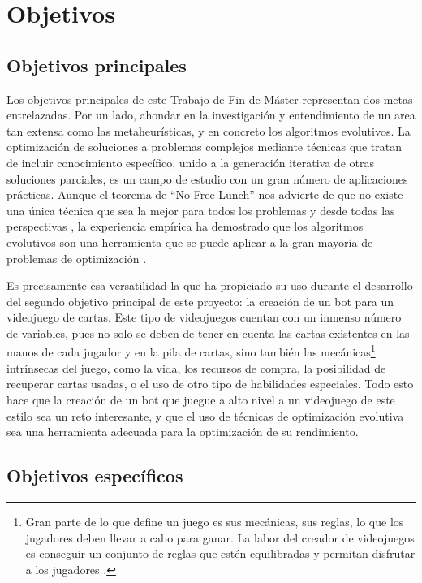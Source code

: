\chapter{Objetivos} \label{chap:objetivos}


\section{Objetivos principales} \label{sec:objetivo_principal}

Los objetivos principales de este Trabajo de Fin de Máster representan dos metas entrelazadas. Por un lado, ahondar en la investigación y entendimiento de un area tan extensa como las metaheurísticas, y en concreto los algoritmos evolutivos. La optimización de soluciones a problemas complejos mediante técnicas que tratan de incluir conocimiento específico, unido a la generación iterativa de otras soluciones parciales, es un campo de estudio con un gran número de aplicaciones prácticas. Aunque el teorema de ``No Free Lunch'' nos advierte de que no existe una única técnica que sea la mejor para todos los problemas y desde todas las perspectivas \cite{wolpert_no_1997}, la experiencia empírica ha demostrado que los algoritmos evolutivos son una herramienta que se puede aplicar a la gran mayoría de problemas de optimización \cite{torres-jimenez_applications_2014}.

Es precisamente esa versatilidad la que ha propiciado su uso durante el desarrollo del segundo objetivo principal de este proyecto: la creación de un bot para un videojuego de cartas. Este tipo de videojuegos cuentan con un inmenso número de variables, pues no solo se deben de tener en cuenta las cartas existentes en las manos de cada jugador y en la pila de cartas, sino también las mecánicas\footnote{Gran parte de lo que define un juego es sus mecánicas, sus reglas, lo que los jugadores deben llevar a cabo para ganar. La labor del creador de videojuegos es conseguir un conjunto de reglas que estén equilibradas y permitan disfrutar a los jugadores \cite{wikipedia_diseno_2025}.} intrínsecas del juego, como la vida, los recursos de compra, la posibilidad de recuperar cartas usadas, o el uso de otro tipo de habilidades especiales. Todo esto hace que la creación de un bot que juegue a alto nivel a un videojuego de este estilo sea un reto interesante, y que el uso de técnicas de optimización evolutiva sea una herramienta adecuada para la optimización de su rendimiento.

\section{Objetivos específicos} \label{sec:objetivos_especificos}

